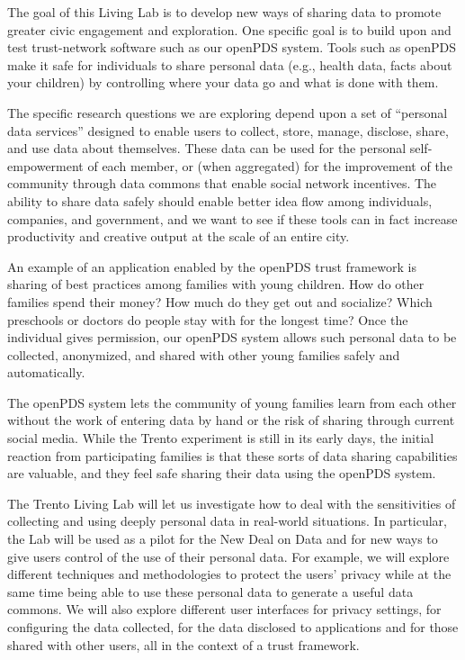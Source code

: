 The goal of this Living Lab is to develop new ways of sharing data to promote greater civic engagement and exploration.
One specific goal is to build upon and test trust-network software such as our openPDS system.
Tools such as openPDS make it safe for individuals to share personal data (e.g., health data, facts about your children) by controlling where your data go and what is done with them.

The specific research questions we are exploring depend upon a set of ``personal data services'' designed to enable users to collect, store, manage, disclose, share, and use data about themselves.
These data can be used for the personal self-empowerment of each member, or (when aggregated) for the improvement of the community through data commons that enable social network incentives.
The ability to share data safely should enable better idea flow among individuals, companies, and government, and we want to see if these tools can in fact increase productivity and creative output at the scale of an entire city.

An example of an application enabled by the openPDS trust framework is sharing of best practices among families with young children.
How do other families spend their money?
How much do they get out and socialize?
Which preschools or doctors do people stay with for the longest time?
Once the individual gives permission, our openPDS system allows such personal data to be collected, anonymized, and shared with other young families safely and automatically.

The openPDS system lets the community of young families learn from each other without the work of entering data by hand or the risk of sharing through current social media.
While the Trento experiment is still in its early days, the initial reaction from participating families is that these sorts of data sharing capabilities are valuable, and they feel safe sharing their data using the openPDS system.

The Trento Living Lab will let us investigate how to deal with the sensitivities of collecting and using deeply personal data in real-world situations.
In particular, the Lab will be used as a pilot for the New Deal on Data and for new ways to give users control of the use of their personal data.
For example, we will explore different techniques and methodologies to protect the users’ privacy while at the same time being able to use these personal data to generate a useful data commons. 
We will also explore different user interfaces for privacy settings, for configuring the data collected, for the data disclosed to applications and for those shared with other users, all in the context of a trust framework.

